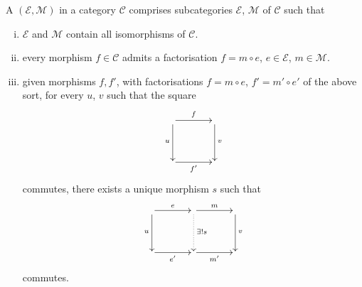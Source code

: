 \begin{definition}
  A  $(\mathcal E,\mathcal M)$ in a category
  $\mathcal C$ comprises subcategories $\mathcal E$, $\mathcal M$ of $\mathcal
  C$ such that
  \begin{enumerate}[(i)]
    \item $\mathcal E$ and $\mathcal M$ contain all isomorphisms of $\mathcal
      C$.
    \item  every morphism $f \in \mathcal C$ admits a factorisation $f=m \circ
      e$, $e \in \mathcal E$, $m \in \mathcal M$.
\item given morphisms $f,f'$, with factorisations $f = m \circ e$, $f' = m' \circ
  e'$ of the above sort, for every $u$, $v$ such that the square
  \[
    \xymatrixcolsep{3pc}
    \xymatrixrowsep{3pc}
    \xymatrix{
       \ar[r]^f \ar[d]_u &  \ar[d]^v \\
       \ar[r]_{f'} & 
    }
  \]
  commutes, there exists a unique morphism $s$ such that
  \[
    \xymatrixcolsep{3pc}
    \xymatrixrowsep{3pc}
    \xymatrix{
      \ar[r]^e \ar[d]_u & \ar[r]^m \ar@{.>}[d]^{\exists! s} &  \ar[d]^v \\
       \ar[r]_{e'}& \ar[r]_{m'} & 
    }
  \]
  commutes.
  \end{enumerate}
\end{definition}

